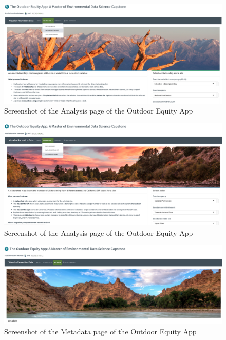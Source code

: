 \documentclass[
]{book}
\begin{document}
\begin{figure}
\includegraphics[width=22.78in]{images/screenshot_data-relationship} \caption{Screenshot of the Analysis page of the Outdoor Equity App}\label{fig:app-screenshot3}
\end{figure}

\begin{figure}
\includegraphics[width=22.72in]{images/screenshot_visitorshed} \caption{Screenshot of the Analysis page of the Outdoor Equity App}\label{fig:app-screenshot4}
\end{figure}

\begin{figure}
\includegraphics[width=22.81in]{images/screenshot_metadata} \caption{Screenshot of the Metadata page of the Outdoor Equity App}\label{fig:app-screenshot5}
\end{figure}
\end{document}
